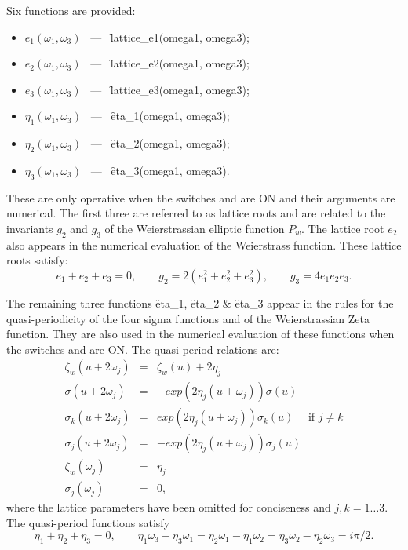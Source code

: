 Six functions are provided:
\begin{itemize}
\item $e_1(\omega_1, \omega_3)$ \ --- \ \f{lattice\_e1(omega1, omega3)};
\item $e_2(\omega_1, \omega_3)$ \ --- \ \f{lattice\_e2(omega1, omega3)};
\item $e_3(\omega_1, \omega_3)$ \ --- \ \f{lattice\_e3(omega1, omega3)};
\item $\eta_1(\omega_1, \omega_3)$ \ --- \ \f{eta\_1(omega1, omega3)};
\item $\eta_2(\omega_1, \omega_3)$ \ --- \ \f{eta\_2(omega1, omega3)};
\item $\eta_3(\omega_1, \omega_3)$ \ --- \ \f{eta\_3(omega1, omega3)}.
\end{itemize}

These are only operative when the switches  and  are ON and their
arguments are numerical. The first three are referred to as lattice roots and are related to the invariants
$g_2$ and $g_3$ of the Weierstrassian elliptic function $P_w$. The lattice root $e_2$ also appears in the numerical
evaluation of the Weierstrass function. These lattice roots satisfy:
\[e_1+e_2+e_3=0,\qquad g_2=2(e_1^2+e_2^2+e_3^2),\qquad g_3= 4e_1e_2e_3.\]

The remaining three functions \f{eta\_1}, \f{eta\_2} \& \f{eta\_3} appear in the rules for the quasi-periodicity of
the four sigma functions and of the Weierstrassian Zeta function. They are also used in the numerical
evaluation of these functions when the switches  and  are ON. The quasi-period relations are:
\begin{eqnarray*}
  \zeta_w(u+2\omega_j) & = & \zeta_w(u)+2\eta_j\\
  \sigma(u+2\omega_j) & = & -exp(2\eta_j(u+\omega_j))\sigma(u)\\
  \sigma_k(u+2\omega_j) & = &  exp(2\eta_j(u+\omega_j))\sigma_k(u) \quad\text{  if  }j\neq k\\
  \sigma_j(u+2\omega_j) & = & -exp(2\eta_j(u+\omega_j))\sigma_j(u)\\
  \zeta_w(\omega_j) & = & \eta_j\\
  \sigma_j(\omega_j) & = & 0,
\end{eqnarray*}
where the lattice parameters have been omitted for conciseness and $j,k = 1\ldots 3$.
The quasi-period functions satisfy
\[\eta_1+\eta_2+\eta_3=0,\qquad
   \eta_1\omega_3-\eta_3\omega_1=\eta_2\omega_1-\eta_1\omega_2=\eta_3\omega_2-\eta_2\omega_3=i\pi/2.\]

